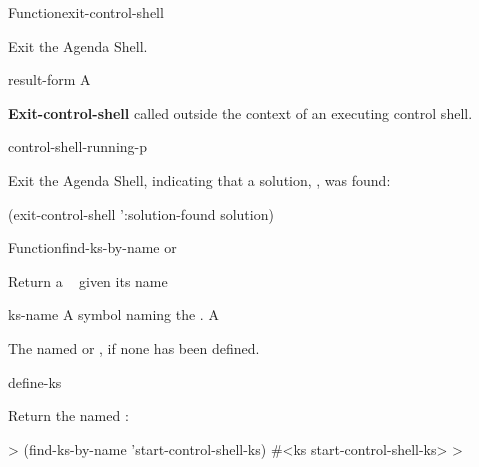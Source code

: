 \documentclass[10pt,twoside,english,pdftex]{article}
\begin{document}
\begin{functiondoc}{Function}{exit-control-shell}%
  { \superstar}
%
%
%
%

\fnsyntax

\fnpurpose Exit the Agenda Shell.

\fnpackage {}

\fnmodule {}

\fnargs
\begin{args}{result-form}
 A 
\end{args}

\fnerrors \textbf{Exit-control-shell} called outside the context of an
executing control shell.

\begin{alsos}{control-shell-running-p}
\end{alsos}

\fnexample Exit the Agenda Shell, indicating that a solution, 
, was found:
%
\W\supp
\begin{example}
  (exit-control-shell ':solution-found solution)
\end{example}

\end{functiondoc}

 
\begin{functiondoc}{Function}{find-ks-by-name}{ 
  \returns{}  or \nil}
%

\fnsyntax

\fnpurpose Return a ~  given its name

\fnpackage {}

\fnmodule {}

\fnargs
\begin{args}{ks-name}
\arg[ks-name] A symbol naming the .
\arg[ks] A 
\end{args}

\fnreturns The   named 
or \nil, if none has been defined.

\begin{alsos}{define-ks}
\also[define-ks]
\also[ks]
\end{alsos}

\fnexample Return the  named :
%
\W\supp
\begin{example}
  > (find-ks-by-name 'start-control-shell-ks)
  #<ks start-control-shell-ks>
  >
\end{example}

\end{functiondoc}
\end{document}

